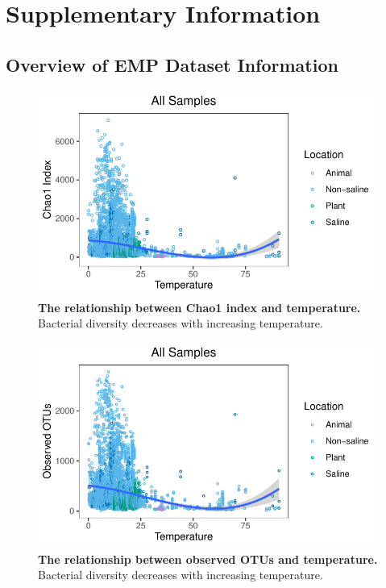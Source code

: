 
\renewcommand{\thefigure}{SI.\arabic{figure}}
\setcounter{figure}{0}

\renewcommand{\thetable}{SI.\arabic{table}}
\setcounter{table}{0}

\section*{Supplementary Information}\label{sec:SI}

\renewcommand{\thesubsection}{SI.\arabic{subsection}}
\setcounter{subsection}{0}


\subsection{Overview of EMP Dataset Information}

\begin{figure}[H]
    \centering
    \includegraphics[scale=0.9]{./Figures/Chao_T_all}
    \caption{\textbf{The relationship between Chao1 index and temperature.} Bacterial diversity decreases with increasing temperature.}
    \label{fig:Chao_T}
\end{figure}

\begin{figure}[H]
    \centering
    \includegraphics[scale=0.9]{./Figures/OO_T_all}
    \caption{\textbf{The relationship between observed OTUs and temperature.} Bacterial diversity decreases with increasing temperature.}
    \label{fig:OO_T}
\end{figure}

